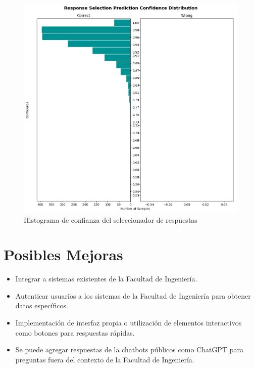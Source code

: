 \begin{figure}[H]
	\centering
	\includegraphics[width=\textwidth]{imagenes/cap5/response_selection_histogram.png}
	\caption{Histograma de confianza del seleccionador de respuestas}
	\label{fig:response_histograma}
\end{figure}

\section{Posibles Mejoras}
\begin{itemize}
	\item Integrar a sistemas existentes de la Facultad de Ingeniería.
	\item Autenticar usuarios a los sistemas de la Facultad de Ingeniería para obtener datos
	      específicos.
	\item Implementación de interfaz propia o utilización de elementos interactivos como
	      botones
	      para respuestas rápidas.
	\item Se puede agregar respuestas de la chatbots públicos como	ChatGPT \cite{api_chatgpt}
	      para preguntas
	      fuera del
	      contexto de la Facultad de Ingeniería.
\end{itemize}
